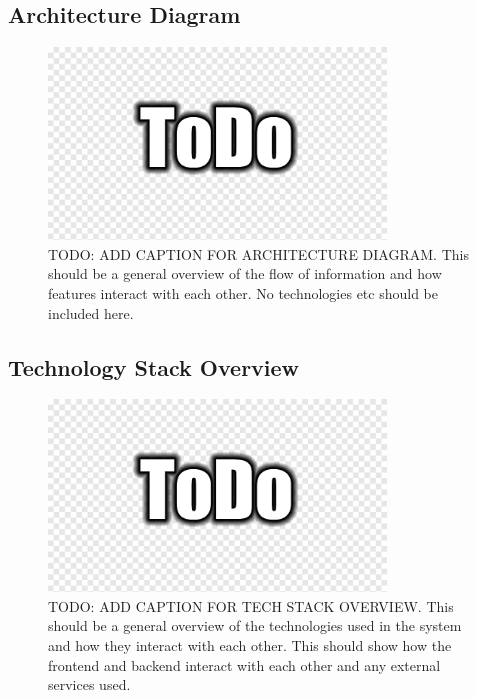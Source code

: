\documentclass[12pt]{article}
\begin{document}
  \subsection{Architecture Diagram}
    \begin{figure}[H]
        \centering
        \includegraphics[width=0.8\textwidth]{architecture_diagram.png}
        \caption{TODO: ADD CAPTION FOR ARCHITECTURE DIAGRAM. This should be a general overview of the flow of information and how 
        features interact with each other. No technologies etc should be included here.}
        \label{fig:architecture_diagram}
    \end{figure}

  \subsection{Technology Stack Overview}
    \begin{figure}[H]
        \centering
        \includegraphics[width=0.8\textwidth]{tech_stack.png}
        \caption{TODO: ADD CAPTION FOR TECH STACK OVERVIEW. This should be a general overview of the technologies used in the system and how they interact with each other.
        This should show how the frontend and backend interact with each other and any external services used.}
        \label{fig:tech_stack_overview}
    \end{figure}
\end{document}
